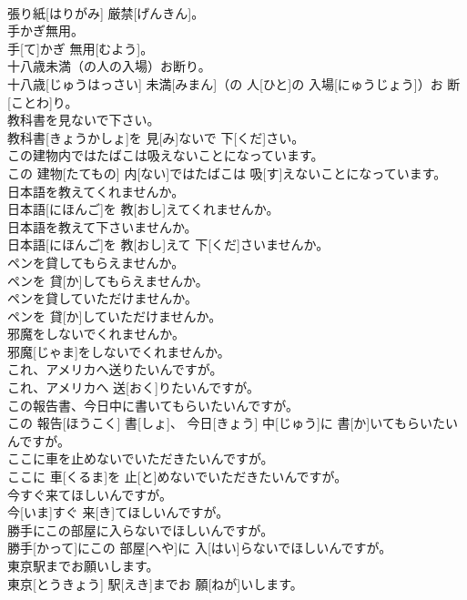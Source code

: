 \documentclass[8pt]{extreport}
\begin{document}
\begin{CJK}{UTF8}{min}
\\	張り紙[はりがみ] 厳禁[げんきん]。
\\	手かぎ無用。	
\\	手[て]かぎ 無用[むよう]。
\\	十八歳未満（の人の入場）お断り。	
\\	十八歳[じゅうはっさい] 未満[みまん]（の 人[ひと]の 入場[にゅうじょう]）お 断[ことわ]り。
\\	教科書を見ないで下さい。	
\\	教科書[きょうかしょ]を 見[み]ないで 下[くだ]さい。
\\	この建物内ではたばこは吸えないことになっています。	
\\	この 建物[たてもの] 内[ない]ではたばこは 吸[す]えないことになっています。
\\	日本語を教えてくれませんか。	
\\	日本語[にほんご]を 教[おし]えてくれませんか。
\\	日本語を教えて下さいませんか。	
\\	日本語[にほんご]を 教[おし]えて 下[くだ]さいませんか。
\\	ペンを貸してもらえませんか。	
\\	ペンを 貸[か]してもらえませんか。
\\	ペンを貸していただけませんか。	
\\	ペンを 貸[か]していただけませんか。
\\	邪魔をしないでくれませんか。	
\\	邪魔[じゃま]をしないでくれませんか。
\\	これ、アメリカへ送りたいんですが。	
\\	これ、アメリカへ 送[おく]りたいんですが。
\\	この報告書、今日中に書いてもらいたいんですが。	
\\	この 報告[ほうこく] 書[しょ]、 今日[きょう] 中[じゅう]に 書[か]いてもらいたいんですが。
\\	ここに車を止めないでいただきたいんですが。	
\\	ここに 車[くるま]を 止[と]めないでいただきたいんですが。
\\	今すぐ来てほしいんですが。	
\\	今[いま]すぐ 来[き]てほしいんですが。
\\	勝手にこの部屋に入らないでほしいんですが。	
\\	勝手[かって]にこの 部屋[へや]に 入[はい]らないでほしいんですが。
\\	東京駅までお願いします。	
\\	東京[とうきょう] 駅[えき]までお 願[ねが]いします。

\end{CJK}
\end{document}
